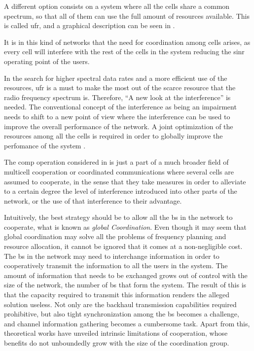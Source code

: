 A different option consists on a system where all the cells share a common
spectrum, so that all of them can use the full amount of resources available.
This is called \gls{ufr}, and a graphical description can be seen in
.

It is in this kind of networks that the need for coordination among cells
arises, as every cell will interfere with the rest of the cells in the system
reducing the \gls{sinr} operating point of the users.

In the search for higher spectral data rates and a more efficient use of the
resources, \gls{ufr} is a must to make the most out of the scarce resource that
the radio frequency spectrum is. Therefore, ``A new look at the interference''
\cite{gesbert10} is needed. The conventional concept of the interference as
being an impairment needs to shift to a new point of view where the interference
can be used to improve the overall performance of the network. A joint
optimization of the resources among all the cells is required in order to
globally improve the perfomance of the system \cite{gesbert07}.

The \gls{comp} operation considered in \cite{3gpprel11} is just a part of a much
broader field of multicell cooperation or coordinated communications where
several cells are assumed to cooperate, in the sense that they take measures in
order to alleviate to a certain degree the level of interference introduced into
other parts of the network, or the use of that interference to their advantage.

Intuitively, the best strategy should be to allow all the \gls{bs} in the
network to cooperate, what is known as \emph{global Coordination}. Even though
it may seem that global coordination may solve all the problems of frequency
planning and resource allocation, it cannot be ignored that it comes at a
non-negligible cost. The \gls{bs} in the network may need to interchange
information in order to cooperatively transmit the information to all the users
in the system. The amount of information that needs to be exchanged grows out of
control with the size of the network, \ie the number of \gls{bs} that form the
system. The result of this is that the capacity required to transmit this
information renders the alleged solution useless. Not only are the backhaul
transmission capabilities required prohibitive, but also tight synchronization
among the \gls{bs} becomes a challenge, and channel information gathering
becomes a cumbersome task. Apart from this, theoretical works \cite{lozano13}
have unveiled intrinsic limitations of cooperation, whose benefits do not
unboundedly grow with the size of the coordination group.

